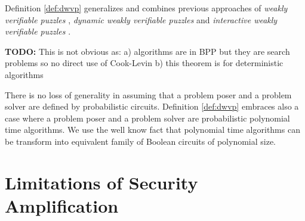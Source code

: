 \documentclass[11pt,a4paper,titlepage]{memoir}
\begin{document}
Definition \ref{def:dwvp} generalizes and combines previous approaches of
\textit{weakly verifiable puzzles} \cite{canetti2004hardness},
\textit{dynamic weakly verifiable puzzles} \cite{Dodis:2009:SAI:1530441.1530450}
and \textit{interactive weakly verifiable puzzles} \cite{DBLP:journals/corr/abs-1002-3534}.

\begin{todo}
  \textbf{TODO:}
  This is not obvious as:
  a) algorithms are in BPP but they are search problems so no direct use of Cook-Levin
  b) this theorem is for deterministic algorithms
\end{todo}

There is no loss of generality in assuming that a problem poser and a problem solver are defined by probabilistic circuits.
Definition \ref{def:dwvp} embraces also a case where a problem poser and a problem solver are probabilistic polynomial time algorithms.
We use the well know fact \cite{LectureNotesCT} that polynomial time algorithms can be transform into equivalent family of Boolean circuits of polynomial size.



\section{Limitations of Security Amplification}


\appendix


\backmatter



\end{document}
